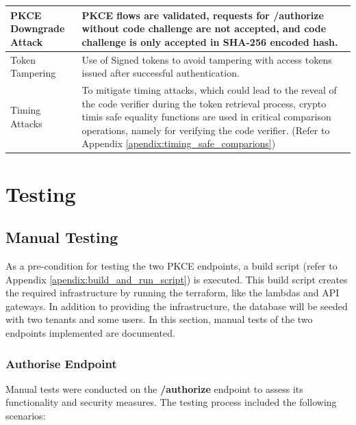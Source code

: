 \begin{longtable}{|p{5cm}|p{10cm}|}
\hline
PKCE Downgrade Attack & PKCE flows are validated, requests for \textbf{/authorize} without code challenge are not accepted, and code challenge is only accepted in SHA-256 encoded hash. \\
\hline
Token Tampering & Use of Signed tokens to avoid tampering with access tokens issued after successful authentication.  \\
\hline
Timing Attacks & To mitigate timing attacks, which could lead to the reveal of the code verifier during the token retrieval process, crypto timis safe equality functions are used in critical comparison operations, namely for verifying the code verifier. (Refer to Appendix \ref{apendix:timing_safe_comparions})  \\
\hline
\end{longtable}

\section{Testing}

\subsection{Manual Testing}
As a pre-condition for testing the two PKCE endpoints, a build script (refer to Appendix \ref{apendix:build_and_run_script}) is executed. This build script creates the required infrastructure by running the terraform, like the lambdas and API gateways. In addition to providing the infrastructure, the database will be seeded with two tenants and some users. In this section, manual tests of the two endpoints implemented are documented.


\subsubsection{Authorise Endpoint}
Manual tests were conducted on the \textbf{/authorize} endpoint to assess its functionality and security measures. The testing process included the following scenarios:


